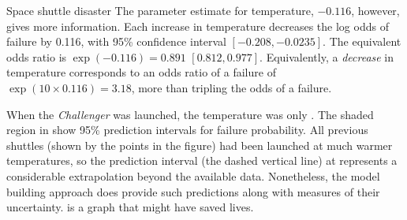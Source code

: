 \documentclass[10pt,krantz2]{krantz}\usepackage[]{graphicx}\usepackage[]{color}
\begin{document}
\begin{Example}[nasa0]{Space shuttle disaster}
The parameter estimate for temperature, $-0.116$, however, gives more information.  Each  increase in temperature decreases the log odds
of failure by 0.116, with 95\% confidence interval $\left[-0.208,
-0.0235\right]$.  The equivalent odds ratio is $\exp(-0.116) = 0.891$ $\left[0.812, 0.977\right]$.
Equivalently, a  \emph{decrease} in temperature corresponds to
an odds ratio of a failure of
$\exp(10 \times 0.116) = 3.18$, more than tripling the odds of a failure.

When the \emph{Challenger} was launched, the temperature was only .
The shaded region in  show 95\% prediction intervals
for failure probability.  All previous shuttles (shown by the points
in the figure) had been launched at much warmer temperatures, so the
prediction interval (the dashed vertical line)
at  represents a considerable extrapolation
beyond the available data.  Nonetheless, the model building approach
does provide such predictions along with measures of their uncertainty.
 is a graph
that might have saved lives.

\end{Example}


\end{document}
